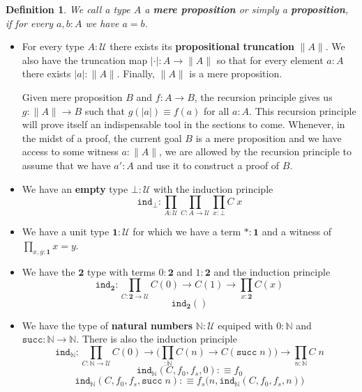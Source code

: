 \documentclass[12pt]{report}
\newtheorem{defn}[thm]{Definition}
\theoremstyle{definition}
\begin{document}
	\begin{defn}
	We call a type $A$ a \textbf{mere proposition} or simply a \textbf{proposition}, if for every $a,b : A$ we have $a = b$.
	\end{defn}
\begin{itemize}
	\item For every type $A : \mathcal{U}$ there exists its \textbf{propositional truncation} $\| A \|$. 
	We also have the truncation map $|\cdot| : A \rightarrow \lVert A \rVert$ so that for every element $a : A$ there exists $|a| : \| A\|$. 
	Finally, $\lVert A\rVert$ is a mere proposition.  

	Given mere proposition $B$ and $f : A \rightarrow B$, the recursion principle gives us $g : \|A\| \rightarrow B$ such that $g(|a|) \equiv f(a)$ for all $a : A$.
	This recursion principle will prove itself an indispensable tool in the sections to come. 
	Whenever, in the midst of a proof, the current goal $B$ is a mere proposition and we have access to some witness $a : \lVert A \rVert$, we are allowed by the recursion principle to assume that we have $a' : A$ and use it to construct a proof of $B$.
	\item We have an \textbf{empty} type $\bot : \mathcal{U}$ with the induction principle
	$$\mathtt{ind}_\bot : \prod_{A : \mathcal{U}}\prod_{C : A \rightarrow \mathcal{U}} \prod_{x  :\bot} C\;x$$
	\item We have a unit type $\mathbf{1} : \mathcal{U}$ for which we have a term $* : \mathbf{1}$ and a witness of $\prod_{x,y : \mathbf{1}} x =y$. 
	\item We have the $\mathbf{2}$ type with terms $0 : \mathbf{2}$ and $1 : \mathbf{2}$ and the induction principle
	$$\mathtt{ind}_\mathbf{2} : \prod_{C : \mathbf{2} \rightarrow \mathcal{U}}C(0)\rightarrow C(1) \rightarrow \prod_{x : \mathbf{2}}C(x)$$
	$$\mathtt{ind}_\mathbf{2}()$$
	\item We have the type of \textbf{natural numbers} $\mathbb{N} : \mathcal{U}$ equiped with $0 : \mathbb{N}$ and $\mathtt{succ} : \mathbb{N} \rightarrow \mathbb{N}$. 
	There is also the induction principle
	$$\mathtt{ind}_\mathbb{N} : \prod_{C : \mathbb{N} \rightarrow \mathcal{U}}C(0)\rightarrow \big(\prod_{ : \mathbb{N}} C(n) \rightarrow C(\mathtt{succ}\;n)\big)\rightarrow \prod_{n : \mathbb{N}}C\;n$$
	$$\mathtt{ind}_\mathbb{N}(C, f_0, f_s, 0) :\equiv f_0$$
	$$\mathtt{ind}_\mathbb{N}(C, f_0, f_s, \mathtt{succ}\;n) :\equiv f_s\big(n, \mathtt{ind}_\mathbb{N}(C,f_0, f_s, n)\big)$$


\end{itemize}
\end{document}
